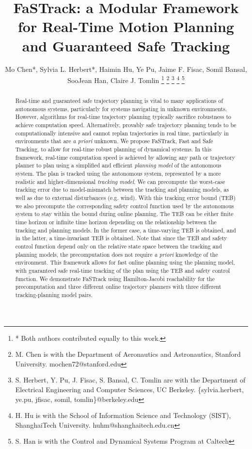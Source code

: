 \documentclass[journal]{IEEEtran}
\title{\LARGE \bf FaSTrack: a Modular Framework for Real-Time Motion Planning and Guaranteed Safe Tracking}
\author{Mo Chen*, Sylvia L. Herbert*, Haimin Hu, Ye Pu, Jaime F. Fisac, Somil Bansal, SooJean Han, Claire J. Tomlin
\thanks{* Both authors contributed equally to this work.}
\thanks{M. Chen is with the Department of Aeronautics and Astronautics, Stanford University. mochen72@stanford.edu}
\thanks{S. Herbert, Y. Pu, J. Fisac, S. Bansal, C. Tomlin are with the Department of Electrical Engineering and Computer Sciences, UC Berkeley. \{sylvia.herbert, ye.pu, jfisac, somil, tomlin\}@berkeley.edu}
\thanks{H. Hu is with the School of Information Science and Technology (SIST), ShanghaiTech
University. huhm@shanghaitech.edu.cn }
\thanks{S. Han is with the Control and Dynamical Systems Program at Caltech}
}
\begin{document}
\maketitle
\thispagestyle{empty}
\pagestyle{empty}

\begin{abstract}
Real-time and guaranteed safe trajectory planning is vital to many applications of autonomous systems, particularly for systems navigating in unknown environments.
However, algorithms for real-time trajectory planning typically sacrifice robustness to achieve computation speed. 
Alternatively, provably safe trajectory planning tends to be computationally intensive and cannot replan trajectories in real time, particularly in environments that are \textit{a priori }unknown. 
We propose FaSTrack, Fast and Safe Tracking, to allow for real-time robust planning of dynamical systems. 
In this framework, real-time computation speed is achieved by allowing any path or trajectory planner to plan using a simplified and efficient \textit{planning model} of the autonomous system.  
The plan is tracked using the autonomous system, represented by a more realistic and higher-dimensional \textit{tracking model}. 
We can precompute the worst-case tracking error due to model-mismatch between the tracking and planning models, as well as due to external disturbances (e.g. wind).  
With this tracking error bound (TEB) we also precompute the corresponding safety control function used by the autonomous system to stay within the bound during online planning.
The TEB can be either finite time horizon or infinite time horizon depending on the relationship between the tracking and planning models.
In the former case, a time-varying TEB is obtained, and in the latter, a time-invariant TEB is obtained.
Note that since the TEB and safety control function depend only on the relative state space between the tracking and planning models, the precomputation does not require \textit{a priori} knowledge of the environment.
This framework allows for fast online planning using the planning model, with guaranteed safe real-time tracking of the plan using the TEB and safety control function.
We demonstrate FaSTrack using Hamilton-Jacobi reachability for the precomputation and three different online trajectory planners with three different tracking-planning model pairs.
\end{abstract}
\end{document}
